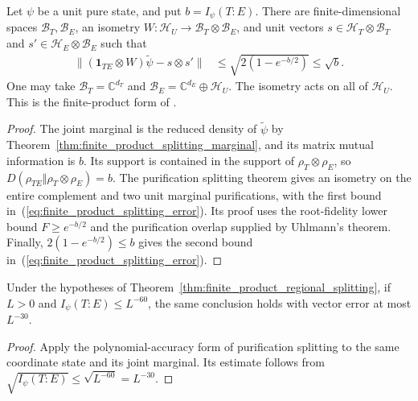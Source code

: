 \begin{theorem}
    \label{thm:finite_product_regional_splitting}
    \leanok
    Let $\psi$ be a unit pure state, and put $b=I_\psi(T:E)$.
    There are finite-dimensional spaces $\mathcal B_T,\mathcal B_E$, an
    isometry $W:\mathcal H_U\to\mathcal B_T\otimes\mathcal B_E$, and
    unit vectors $s\in\mathcal H_T\otimes\mathcal B_T$ and
    $s'\in\mathcal H_E\otimes\mathcal B_E$ such that
    \begin{align}
        \|(\mathbf 1_{TE}\otimes W)\widetilde\psi-s\otimes s'\|
        &\le\sqrt{2(1-e^{-b/2})}\le\sqrt b.
        \label{eq:finite_product_splitting_error}
    \end{align}
    One may take $\mathcal B_T=\mathbb C^{d_T}$ and
    $\mathcal B_E=\mathbb C^{d_E}\oplus\mathcal H_U$.
    The isometry acts on all of $\mathcal H_U$.
    This is the finite-product form of
    \cite[Lemma~6.4]{OpenAI2026PolynomialPEPS}.
\end{theorem}
\begin{proof}\leanok
    The joint marginal is the reduced density of $\widetilde\psi$ by
    Theorem~\ref{thm:finite_product_splitting_marginal}, and its matrix
    mutual information is $b$. Its support is contained in the support of
    $\rho_T\otimes\rho_E$, so
    $D(\rho_{TE}\Vert\rho_T\otimes\rho_E)=b$.
    The purification splitting theorem gives an isometry on the entire
    complement and two unit marginal purifications, with the first bound
    in~(\ref{eq:finite_product_splitting_error}). Its proof uses the
    root-fidelity lower bound $F\ge e^{-b/2}$ and the purification overlap
    supplied by Uhlmann's theorem. Finally, $2(1-e^{-b/2})\le b$ gives the
    second bound in~(\ref{eq:finite_product_splitting_error}).
\end{proof}

\begin{theorem}
    \label{thm:finite_product_splitting_polynomial}
    \leanok
    Under the hypotheses of
    Theorem~\ref{thm:finite_product_regional_splitting}, if $L>0$ and
    $I_\psi(T:E)\le L^{-60}$, the same conclusion holds with vector error
    at most $L^{-30}$.
\end{theorem}
\begin{proof}\leanok
    Apply the polynomial-accuracy form of purification splitting to the
    same coordinate state and its joint marginal. Its estimate follows
    from $\sqrt{I_\psi(T:E)}\le\sqrt{L^{-60}}=L^{-30}$.
\end{proof}
